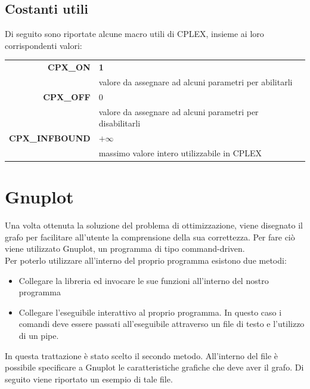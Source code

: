 \subsection{Costanti utili}
Di seguito sono riportate alcune macro utili di CPLEX, insieme ai loro corrispondenti valori:
\begin{table}[h]
\begin{tabular}{|r|l|}
\hline
\textbf{CPX\_ON} & {\textbf{1}}\\
{} & {valore da assegnare ad alcuni parametri per abilitarli}\\
\hline
\textbf{CPX\_OFF} & {0}\\
{} & {valore da assegnare ad alcuni parametri per disabilitarli}\\
\hline
\textbf{CPX\_INFBOUND} & {$+\infty$}\\
{} & {massimo valore intero utilizzabile in CPLEX}\\
\hline
\end{tabular}
\end{table}

\section{Gnuplot}\label{gnuplot}
Una volta ottenuta la soluzione del problema di ottimizzazione, viene disegnato il grafo per facilitare all'utente la comprensione della sua correttezza. Per fare ciò viene utilizzato Gnuplot, un programma di tipo command-driven.\\
Per poterlo utilizzare all'interno del proprio programma esistono due metodi:
\begin{itemize}
\item{Collegare la libreria ed invocare le sue funzioni all'interno del nostro programma}
\item{Collegare l'eseguibile interattivo al proprio programma. In questo caso i comandi deve essere passati all'eseguibile attraverso un file di testo e l'utilizzo di un pipe.}\\
\end{itemize}
In questa trattazione è stato scelto il secondo metodo. All'interno del file è possibile specificare a Gnuplot le caratteristiche grafiche che deve aver il grafo. Di seguito viene riportato un esempio di tale file.\\



